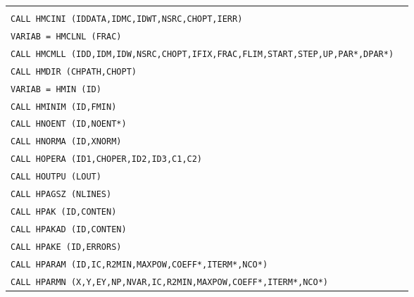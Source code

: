 \begin{longtable}{|>{\tt}p{.9\linewidth}r|}
&                                                       \pageref{HMAXIM} \\
CALL     HMCINI (IDDATA,IDMC,IDWT,NSRC,CHOPT,IERR)
&                                                       \pageref{HMCINI} \\
VARIAB = HMCLNL (FRAC)
&                                                       \pageref{HMCLNL} \\
CALL     HMCMLL (IDD,IDM,IDW,NSRC,CHOPT,IFIX,FRAC,FLIM,START,STEP,UP,PAR*,DPAR*)
&                                                       \pageref{HMCMLL} \\
CALL     HMDIR  (CHPATH,CHOPT)               
&                                                       \pageref{HMDIR}  \\
VARIAB = HMIN   (ID)                         
&                                                       \pageref{HMIN}   \\
CALL     HMINIM (ID,FMIN)                    
&                                                       \pageref{HMINIM} \\
CALL     HNOENT (ID,NOENT*)                  
&                                                       \pageref{HNOENT} \\
CALL     HNORMA (ID,XNORM)                   
&                                                       \pageref{HNORMA} \\
CALL     HOPERA (ID1,CHOPER,ID2,ID3,C1,C2)   
&                                                       \pageref{HOPERA} \\
CALL     HOUTPU (LOUT)                       
&                                                       \pageref{HOUTPU} \\
CALL     HPAGSZ (NLINES)                     
&                                                       \pageref{HPAGSZ} \\
CALL     HPAK   (ID,CONTEN)                  
&                                                       \pageref{HPAK}   \\
CALL     HPAKAD (ID,CONTEN)                  
&                                                       \pageref{HPAKAD} \\
CALL     HPAKE  (ID,ERRORS)                  
&                                                       \pageref{HPAKE}  \\
CALL     HPARAM (ID,IC,R2MIN,MAXPOW,COEFF*,ITERM*,NCO*)
&                                                       \pageref{HPARAM} \\
CALL     HPARMN (X,Y,EY,NP,NVAR,IC,R2MIN,MAXPOW,COEFF*,ITERM*,NCO*)

\end{longtable}
